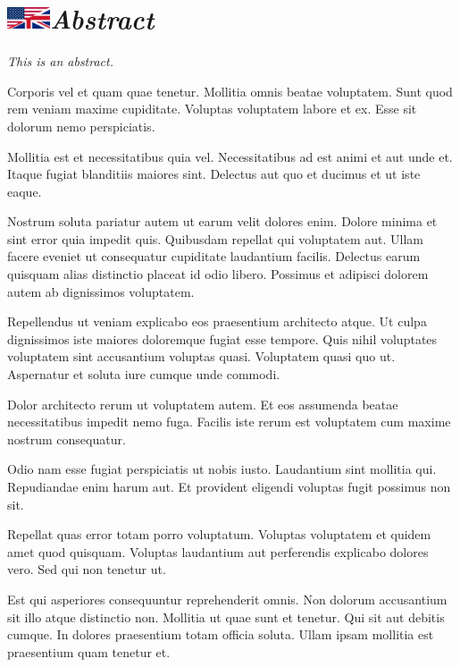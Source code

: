 \chapter[Résumé (anglais)]{\includegraphics[height=18pt]{Front/Figures/US-UK_flag.pdf}\quad\itshape Abstract}

{\itshape
This is an abstract.

Corporis vel et quam quae tenetur. Mollitia omnis beatae voluptatem. Sunt quod rem veniam maxime cupiditate. Voluptas voluptatem labore et ex. Esse sit dolorum nemo perspiciatis.

Mollitia est et necessitatibus quia vel. Necessitatibus ad est animi et aut unde et. Itaque fugiat blanditiis maiores sint. Delectus aut quo et ducimus et ut iste eaque.

Nostrum soluta pariatur autem ut earum velit dolores enim. Dolore minima et sint error quia impedit quis. Quibusdam repellat qui voluptatem aut. Ullam facere eveniet ut consequatur cupiditate laudantium facilis. Delectus earum quisquam alias distinctio placeat id odio libero. Possimus et adipisci dolorem autem ab dignissimos voluptatem.

Repellendus ut veniam explicabo eos praesentium architecto atque. Ut culpa dignissimos iste maiores doloremque fugiat esse tempore. Quis nihil voluptates voluptatem sint accusantium voluptas quasi. Voluptatem quasi quo ut. Aspernatur et soluta iure cumque unde commodi.

Dolor architecto rerum ut voluptatem autem. Et eos assumenda beatae necessitatibus impedit nemo fuga. Facilis iste rerum est voluptatem cum maxime nostrum consequatur.

Odio nam esse fugiat perspiciatis ut nobis iusto. Laudantium sint mollitia qui. Repudiandae enim harum aut. Et provident eligendi voluptas fugit possimus non sit.

Repellat quas error totam porro voluptatum. Voluptas voluptatem et quidem amet quod quisquam. Voluptas laudantium aut perferendis explicabo dolores vero. Sed qui non tenetur ut.

Est qui asperiores consequuntur reprehenderit omnis. Non dolorum accusantium sit illo atque distinctio non. Mollitia ut quae sunt et tenetur. Qui sit aut debitis cumque. In dolores praesentium totam officia soluta. Ullam ipsam mollitia est praesentium quam tenetur et.
}
